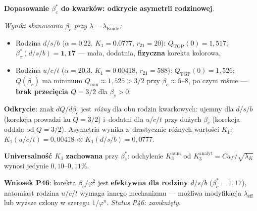 \begin{problem}
\begin{description}[leftmargin=2em, labelindent=0pt]
\item[OK-8 --- \textbf{Asymetria rodzin kwarkowych (P46)}:]
  \textbf{Dopasowanie $\beta_c^*$ do kwarków: odkrycie asymetrii rodzinowej}.
  \par
  \textit{Wyniki skanowania $\beta_c$ przy $\lambda = \lambda_\text{Koide}$:}
  \begin{itemize}[nosep]
    \item Rodzina $d/s/b$ ($\alpha = 0.22$, $K_1 = 0.0777$, $r_{21} = 20$):
          $Q_\text{TGP}(0) = 1{,}517$; $\beta_c^*(d/s/b) = \mathbf{1{,}17}$ ---
          ma\l{}a, dodatnia, \textbf{fizyczna} korekta kolorowa,
    \item Rodzina $u/c/t$ ($\alpha = 20.3$, $K_1 = 0.00418$, $r_{21} = 588$):
          $Q_\text{TGP}(0) = 1{,}526$; $Q(\beta_c)$ ma minimum
          $Q_\text{min} \approx 1{,}525 > 3/2$ przy $\beta_c \approx 5$--$8$,
          po czym ro\'snie --- \textbf{brak przeci\k{e}cia $Q=3/2$} dla $\beta_c > 0$.
  \end{itemize}
  \par
  \textbf{Odkrycie}: znak $dQ/d\beta_c$ jest \emph{r\'o\.zny} dla obu rodzin
  kwarkowych: ujemny dla $d/s/b$ (korekcja prowadzi ku $Q=3/2$) i~dodatni
  dla $u/c/t$ przy du\.zych $\beta_c$ (korekcja oddala od $Q=3/2$).
  Asymetria wynika z~drastycznie r\'o\.znych warto\'sci $K_1$:
  $K_1(u/c/t) = 0{,}00418 \ll K_1(d/s/b) = 0{,}0777$.
  \par
  \textbf{Universalno\'s\'c $K_3$ zachowana} przy $\beta_c^*$:
  odchylenie $K_3^\text{num}$ od $K_3^\text{analyt} = C a_\Gamma/\!\sqrt{\lambda_K}$
  wynosi jedynie $0{,}10$--$0{,}11\%$.
  \par
  \textbf{Wniosek P46}: korekta $\beta_c/\varphi^2$ jest \textbf{efektywna dla
  rodziny $d/s/b$} ($\beta_c^* = 1{,}17$), natomiast rodzina $u/c/t$
  wymaga innego mechanizmu --- mo\.zliwa modyfikacja $\lambda_\text{eff}$
  lub wy\.zsze cz\l{}ony w szeregu $1/\varphi^n$.
  \textit{Status P46: zamkni\k{e}ty.}


\end{description}
\end{problem}
